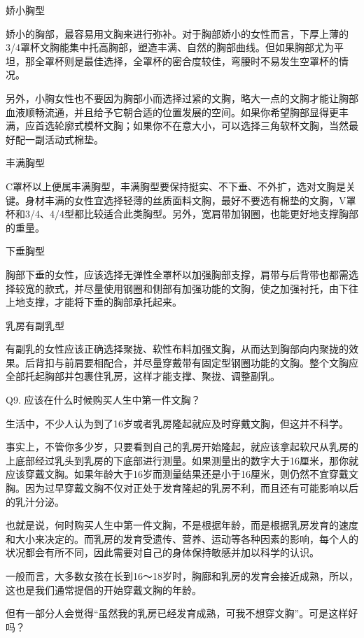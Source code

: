 \documentclass[12pt,UTF8]{ctexbook}
\begin{document}
娇小胸型

娇小的胸部，最容易用文胸来进行弥补。对于胸部娇小的女性而言，下厚上薄的3/4罩杯文胸能集中托高胸部，塑造丰满、自然的胸部曲线。但如果胸部尤为平坦，那全罩杯则是最佳选择，全罩杯的密合度较佳，弯腰时不易发生空罩杯的情况。



另外，小胸女性也不要因为胸部小而选择过紧的文胸，略大一点的文胸才能让胸部血液顺畅流通，并且给予它朝合适的位置发展的空间。如果你希望胸部显得更丰满，应首选轮廓式模杯文胸；如果你不在意大小，可以选择三角软杯文胸，当然最好配一副活动式棉垫。

丰满胸型

C罩杯以上便属丰满胸型，丰满胸型要保持挺实、不下垂、不外扩，选对文胸是关键。身材丰满的女性宜选择轻薄的丝质面料文胸，最好不要选有棉垫的文胸，V罩杯和3/4、4/4型都比较适合此类胸型。另外，宽肩带加钢圈，也能更好地支撑胸部的重量。

下垂胸型

胸部下垂的女性，应该选择无弹性全罩杯以加强胸部支撑，肩带与后背带也都需选择较宽的款式，并尽量使用钢圈和侧部有加强功能的文胸，使之加强衬托，由下往上地支撑，才能将下垂的胸部承托起来。



乳房有副乳型

有副乳的女性应该正确选择聚拢、软性布料加强文胸，从而达到胸部向内聚拢的效果。后背扣与前肩要相配合，并尽量穿戴带有固定型钢圈功能的文胸。整个文胸应全部托起胸部并包裹住乳房，这样才能支撑、聚拢、调整副乳。





Q9. 应该在什么时候购买人生中第一件文胸？


生活中，不少人认为到了16岁或者乳房隆起就应及时穿戴文胸，但这并不科学。


事实上，不管你多少岁，只要看到自己的乳房开始隆起，就应该拿起软尺从乳房的上底部经过乳头到乳房的下底部进行测量。如果测量出的数字大于16厘米，那你就应该穿戴文胸。如果年龄大于16岁而测量结果还是小于16厘米，则仍然不宜穿戴文胸。因为过早穿戴文胸不仅对正处于发育隆起的乳房不利，而且还有可能影响以后的乳汁分泌。

也就是说，何时购买人生中第一件文胸，不是根据年龄，而是根据乳房发育的速度和大小来决定的。而乳房的发育受遗传、营养、运动等各种因素的影响，每个人的状况都会有所不同，因此需要对自己的身体保持敏感并加以科学的认识。


一般而言，大多数女孩在长到16～18岁时，胸廊和乳房的发育会接近成熟，所以，这也是我们通常提倡的开始穿戴文胸的年龄。

但有一部分人会觉得“虽然我的乳房已经发育成熟，可我不想穿文胸”。可是这样好吗？
\end{document}
